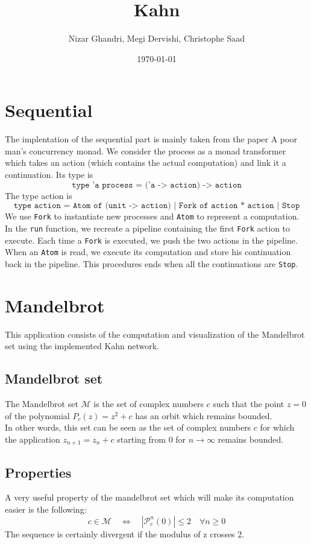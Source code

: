\documentclass{article}
\title{Kahn}
\author{Nizar Ghandri, Megi Dervishi, Christophe Saad}
\date{\today}
\begin{document}
\maketitle

\section{Sequential}
The implentation of the sequential part is mainly taken from the paper  A poor man’s concurrency monad. We consider the process as a monad transformer which takes an action (which contains the actual computation) and link it a continuation. Its type is $$\texttt{type 'a process = ('a -> action) -> action}$$
The type action is $$\texttt{type action  = Atom of (unit -> action) | Fork of action * action | Stop}$$
We use \texttt{Fork} to instantiate new processes and \texttt{Atom} to represent a computation.\\
In the \texttt{run} function, we recreate a pipeline containing the first \texttt{Fork} action to execute. Each time a \texttt{Fork} is executed, we push the two actions in the pipeline. When an \texttt{Atom} is read, we execute its computation and store his continuation back in the pipeline. This procedures ends when all the continuations are \texttt{Stop}.

\section{Mandelbrot}
This application consists of the computation and visualization of the Mandelbrot set using the implemented Kahn network.
\subsection{Mandelbrot set}
The Mandelbrot set $\mathcal{M}$ is the set of complex numbers $c$ such that the point $z = 0$ of the polynomial $P_c(z) = z^2 + c$ has an orbit which remains bounded. \\
In other words, this set can be seen as the set of complex numbers $c$ for which the application $z_{n+1} = z_n + c$ starting from $0$ for $n \rightarrow \infty$ remains bounded.

\subsection{Properties}
A very useful property of the mandelbrot set which will make its computation easier is the following:
	$$c \in \mathcal{M}  \quad \Longleftrightarrow \quad |\mathcal{P}^n_c(0)| \leq 2 \quad \forall n\geq 0$$
The sequence is certainly divergent if the modulus of z crosses 2.
\end{document}
